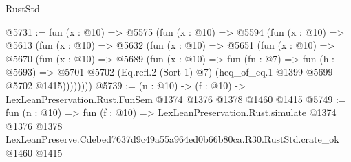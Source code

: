 \begin{lexlean}{RustStd}
\begin{coremodule}
@5731 := fun (x : @10) =>
  @5575
    (fun (x : @10) =>
    @5594
      (fun (x : @10) =>
      @5613
        (fun (x : @10) =>
        @5632
          (fun (x : @10) =>
          @5651
            (fun (x : @10) =>
            @5670
              (fun (x : @10) =>
              @5689
                (fun (x : @10) =>
                fun (fn : @7) =>
                fun (h : @5693) =>
                @5701 @5702 (Eq.refl.{2} (Sort 1) @7) (heq_of_eq.{1} @1399 @5699 @5702 @1415))))))))
@5739 := (n : @10) -> (f : @10) -> LexLeanPreservation.Rust.FunSem @1374 @1376 @1378 @1460 @1415
@5749 := fun (n : @10) =>
  fun (f : @10) =>
  LexLeanPreservation.Rust.simulate
    @1374
    @1376
    @1378
    LexLeanPreserve.Cdebed7637d9c49a55a964ed0b66b80ca.R30.RustStd.crate_ok
    @1460
    @1415
\end{coremodule}
\end{lexlean}
